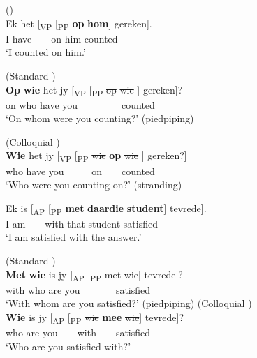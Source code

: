 \documentclass[output=paper]{LSP/langsci}
\begin{document}
\ea%
     \label{ex:biberauer:22}
    \ea  ()  \label{ex:biberauer:22a}\\
	\gll Ek het [\textsubscript{VP} [\textsubscript{PP} \textbf{op} \textbf{hom}] gereken].     \\
      I    have     ~ ~     on him   counted\\
    \glt ‘I counted on him.’



   \ex (Standard )  \label{ex:biberauer:22b}\\
\gll  \textbf{Op} \textbf{wie}  het     jy [\textsubscript{VP} [\textsubscript{PP} \st{op} \st{wie} ] gereken]?      \\
      on  who have  you          ~ ~  ~ ~   ~        counted\\
    \glt ‘On whom were you counting?’   (piedpiping)

   \ex   (Colloquial )   \label{ex:biberauer:22c}\\
\gll  \textbf{Wie}  het    jy    [\textsubscript{VP} [\textsubscript{PP} \st{wie}{\rmfnm} \textbf{op} \st{wie} ] gereken?]\\
      who  have you    ~ ~  ~               on   ~     ~   counted\\
    \glt ‘Who were you counting on?’    (stranding)

\z
\z
{} 

\ea%
    \label{ex:biberauer:23}
    \ea  \label{ex:biberauer:23a}
    \gll   Ek is [\textsubscript{AP} [\textsubscript{PP} \textbf{met} \textbf{daardie} \textbf{student}] tevrede].   \\
	   I    am     ~ ~    with that        student    satisfied\\
    \glt ‘I am satisfied with the answer.’
    
   \ex (Standard ) \label{ex:biberauer:23b}\\
\gll \textbf{Met} \textbf{wie}  is    jy   [\textsubscript{AP} [\textsubscript{PP} met wie] tevrede]?         \\
      with who are you                 ~ ~   ~ ~        satisfied ~ ~ ~ \\
    \glt ‘With whom are you satisfied?’    (piedpiping)
   \ex (Colloquial ) \label{ex:biberauer:23c}\\
\gll   \textbf{Wie} is   jy [\textsubscript{AP} [\textsubscript{PP} \st{wie} \textbf{mee} \st{wie}] tevrede]?   \\
      who are you           ~ ~     with    ~ ~     satisfied\\
    \glt ‘Who are you satisfied with?’
\z
\z
\end{document}
